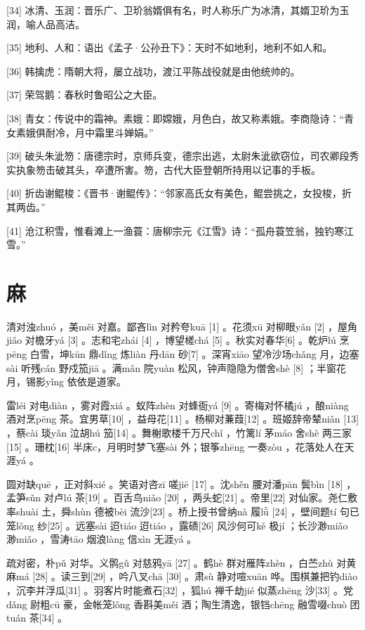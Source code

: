 \documentclass[12pt,UTF8]{ctexbook}
\begin{document}
[34] 冰清、玉润：晋乐广、卫玠翁婿俱有名，时人称乐广为冰清，其婿卫玠为玉润，喻人品高洁。

[35] 地利、人和：语出《孟子·公孙丑下》：天时不如地利，地利不如人和。

[36] 韩擒虎：隋朝大将，屡立战功，渡江平陈战役就是由他统帅的。

[37] 荣驾鹅：春秋时鲁昭公之大臣。

[38] 青女：传说中的霜神。素娥：即嫦娥，月色白，故又称素娥。李商隐诗：“青女素娥俱耐冷，月中霜里斗婵娟。”

[39] 破头朱泚笏：唐德宗时，京师兵变，德宗出逃，太尉朱泚欲窃位，司农卿段秀实执象笏击破其头，卒遭所害。笏，古代大臣登朝所持用以记事的手板。

[40] 折齿谢鲲梭：《晋书·谢鲲传》：“邻家高氏女有美色，鲲尝挑之，女投梭，折其两齿。”

[41] 沧江积雪，惟看滩上一渔蓑：唐柳宗元《江雪》诗：“孤舟蓑笠翁，独钓寒江雪。”





\chapter{麻}


清对浊zhuó ，美měi 对嘉。鄙吝lìn 对矜夸kuā [1] 。花须xū 对柳眼yǎn [2] ，屋角jiǎo 对檐牙yá [3] 。志和宅zhái [4] ，博望槎chá [5] 。秋实对春华[6] 。乾炉lú 烹pēng 白雪，坤kūn 鼎dǐng 炼liàn 丹dān 砂[7] 。深宵xiāo 望冷沙场chǎng 月，边塞sài 听残cán 野戍笳jiā 。满mǎn 院yuàn 松风，钟声隐隐为僧舍shè [8] ；半窗花月，锡影yǐng 依依是道家。

雷léi 对电diàn ，雾对霞xiá 。蚁阵zhèn 对蜂衙yá [9] 。寄梅对怀橘jú ，酿niàng 酒对烹pēng 茶。宜男草[10] ，益母花[11] 。杨柳对蒹葭[12] 。班姬辞帝辇niǎn [13] ，蔡cài 琰yǎn 泣胡hú 笳[14] 。舞榭歌楼千万尺chǐ ，竹篱lí 茅máo 舍shè 两三家[15] 。珊枕[16] 半床c，月明时梦飞塞sài 外；银筝zhēng 一奏zòu ，花落处人在天涯yá 。

圆对缺quē ，正对斜xié 。笑语对咨zī 嗟jiē [17] 。沈shěn 腰对潘pān 鬓bìn [18] ，孟笋sǔn 对卢lú 茶[19] 。百舌鸟niǎo [20] ，两头蛇[21] 。帝里[22] 对仙家。尧仁敷率shuài 土，舜shùn 德被bèi 流沙[23] 。桥上授书曾纳nà 履lǚ [24] ，壁间题tí 句已笼lǒng 纱[25] 。远塞sài 迢tiáo 迢tiáo ，露碛[26] 风沙何可kě 极jí ；长沙渺miǎo 渺miǎo ，雪涛tāo 烟浪làng 信xìn 无涯yá 。

疏对密，朴pǔ 对华。义鹘gǔ 对慈鸦yā [27] 。鹤hè 群对雁阵zhèn ，白苎zhù 对黄麻má [28] 。读三到[29] ，吟八叉chā [30] 。肃sù 静对喧xuān 哗。围棋兼把钓diào ，沉李并浮瓜[31] 。羽客片时能煮石[32] ，狐hú 禅千劫jié 似蒸zhēng 沙[33] 。党dǎng 尉粗cū 豪，金帐笼lǒng 香斟美měi 酒；陶生清逸，银铛chēng 融雪啜chuò 团tuán 茶[34] 。
\end{document}
